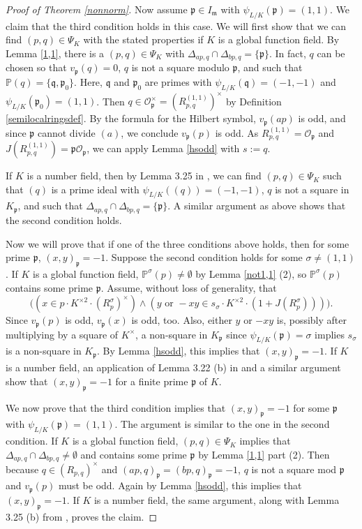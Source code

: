 \documentclass[12pt,reqno]{amsart}
\newcommand{\qq}{\mathfrak{q}}
\newcommand{\mm}{\mathfrak{m}}
\newcommand{\OO}{\mathcal{O}}
\newcommand{\pp}{\mathfrak{p}}
\newcommand{\PP}{\mathbb{P}}
\theoremstyle{definition}
\begin{document}
\begin{proof}[Proof of Theorem \ref{nonnorm}]
Now assume $\pp \in I_{\mm}$ with $\psi_{L/K}(\pp)=(1,1)$. We claim that the third condition holds
in this case. We will first show that we can find $(p,q)\in
\Psi_K$ with the stated properties if $K$ is a global function field. By Lemma \ref{1,1}, there is a
$(p,q)\in \Psi_K$ with $\Delta_{ap,q}\cap \Delta_{bp,q}=\{\pp\}$. In fact,
 $q$ can be chosen so that $v_{\pp}(q)=0$, $q$ is not a square modulo $\pp$, and such that $\PP(q)=\{\qq,\pp_0\}$. Here, $\qq$ and $\pp_0$ are primes with 
$\psi_{L/K}(\qq)=(-1,-1)$ and $\psi_{L/K}(\pp_0)=(1,1)$. Then $q\in
\OO_{\pp}^{\times}=(R^{(1,1)}_{p,q})^{\times}$ by Definition \ref{semilocalringsdef}. By the formula for the Hilbert symbol,
$v_{\pp}(ap)$ is odd, and since $\pp$ cannot divide $(a)$, we conclude $v_{\pp}(p)$ is odd. As $R_{p,q}^{(1,1)}=\OO_{\pp}$ and
$J(R_{p,q}^{(1,1)})=\pp\OO_{\pp}$, we can apply Lemma \ref{hsodd} with
$s:=q$. 

If $K$ is a number field, then by Lemma 3.25 in \cite{Park},
we can find $(p,q)\in \Psi_K$ such that $(q)$ is a prime ideal with
$\psi_{L/K}((q))=(-1,-1)$, $q$ is not a square in $K_{\pp}$, and such that
$\Delta_{ap,q}\cap\Delta_{bp,q}=\{\pp\}$. A similar argument as above
shows that the second condition holds.

Now we will prove that if one of the three conditions above holds, then for
some prime $\pp$, $(x,y)_{\pp}=-1$. Suppose the second condition
holds for some $\sigma\not=(1,1)$. If $K$ is a global function field, $\PP^{\sigma}(p)\not=\emptyset$ by Lemma \ref{not1,1} (2), so $\PP^{\sigma}(p)$ contains some
prime $\pp$. Assume, without loss of generality, that
\[
\big((x\in p \cdot K^{\times2} \cdot (R_{p}^{\sigma})^{\times}) \land (y \text{ or } -xy \in s_{\sigma} \cdot K^{\times2} \cdot (1+J(R^{\sigma}_p)))\big).
\]
Since $v_{\pp}(p)$ is odd, $v_{\pp}(x)$ is odd,
too. Also, either $y$ or $-xy$ is, possibly after multiplying by a
square of $K^{\times}$, a non-square in $K_{\pp}$ since
$\psi_{L/K}(\pp)=\sigma$ implies $s_{\sigma}$ is a non-square in
$K_{\pp}$. By Lemma \ref{hsodd}, this implies that
$(x,y)_{\pp}=-1$. If $K$ is a number field, an application of Lemma 3.22 (b) in \cite{Park} and a similar argument show that $(x,y)_{\pp}=-1$ for a finite prime $\pp$ of $K$. 

We now prove that the third condition implies that $(x,y)_{\pp}=-1$ for some
$\pp$ with $\psi_{L/K}(\pp)=(1,1)$. The argument is similar to the one in the second condition. If $K$ is a global function field, $(p,q)\in \Psi_K$ implies that 
$\Delta_{ap,q}\cap\Delta_{bp,q}\not=\emptyset$ and contains some prime $\pp$ by Lemma \ref{1,1} part (2). Then because $q\in (R_{p,q})^{\times}$ and
$(ap,q)_{\pp}=(bp,q)_{\pp}=-1$, $q$ is not a square mod $\pp$ and $v_{\pp}(p)$ must be odd. Again by Lemma
\ref{hsodd}, this implies that $(x,y)_{\pp}=-1$. If $K$ is a number field, the same argument, along with Lemma 3.25 (b) from \cite{Park}, proves the claim.


\end{proof}
\end{document}
